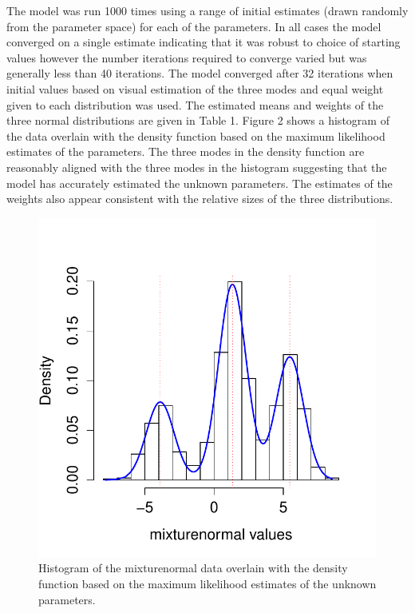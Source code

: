 \documentclass[a4paper, 10pt]{article}
\begin{document}
The model was run 1000 times using a range of initial estimates (drawn randomly from the parameter space) for each of the parameters. In all cases the model converged on a single estimate indicating that it was robust to choice of starting values however the number iterations required to converge varied but was generally less than 40 iterations. The model converged after 32 iterations when initial values based on visual estimation of the three modes and equal weight given to each distribution was used. The estimated means and weights of the three normal distributions are given in Table 1. Figure 2 shows a histogram of the data overlain with the density function based on the maximum likelihood estimates of the parameters. The three modes in the density function are reasonably aligned with the three modes in the histogram suggesting that the model has accurately estimated the unknown parameters. The estimates of the weights also appear consistent with the relative sizes of the three distributions.

\begin{figure}[h]
\begin{center}
\includegraphics[scale=0.75]{density.pdf}
\caption{Histogram of the mixturenormal data overlain with the density function based on the maximum likelihood estimates of the unknown parameters.}
\label{F:Box}
\end{center}
\end{figure}
\end{document}
